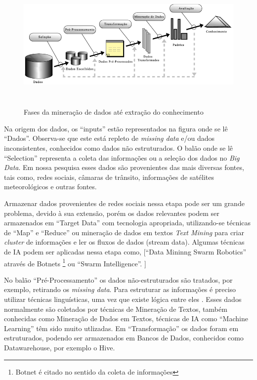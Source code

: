 \begin{figure}[!ht]
\centering
\caption{Fases da mineração de dados até extração do conhecimento}
\includegraphics[width=135mm, height=65mm]{Figuras/BigData/Fayyad.png}
\end{figure}


Na origem dos dados, os ``inputs'' estão representados na figura onde se lê ``Dados''. Observa-se que este está repleto de \textit{missing data} e/ou dados inconsistentes, conhecidos como dados não estruturados. 
O balão onde se lê ``Selection'' representa a coleta das informações ou a seleção dos dados no \textit{Big Data}.
Em nossa pesquisa esses dados são provenientes das mais diversas fontes, tais como, redes sociais, câmaras de trânsito, informações de satélites meteorológicos e outras fontes.

Armazenar dados provenientes de redes sociais nessa etapa pode ser um grande problema, devido à sua extensão, porém os dados relevantes podem ser armazenados em ``Target Data'' 
com tecnologia apropriada, utilizando-se técnicas de ``Map'' e ``Reduce'' ou mineração de dados em textos \textit{Text Mining} para criar \textit{cluster} de informações e ler os fluxos de dados (stream data). 
Algumas técnicas de IA podem ser aplicadas nessa etapa como, [``Data Mininng Swarm Robotics'' através de Botnets \footnote{Botnet é citado no sentido da coleta de informações} ou ``Swarm Intelligence''. ]

No balão ``Pré-Processamento'' os dados não-estruturados são tratados, por exemplo, retirando os \textit{missing data}. 
Para estruturar as informações é preciso utilizar técnicas linguísticas, uma vez que existe lógica entre eles \cite{Aranha2006}.
Esses dados normalmente são coletados por técnicas de Mineração de Textos, também conhecidas como Mineração de Dados em Textos, técnicas de IA como ``Machine Learning'' 
têm sido muito utlizadas. Em ``Transformação'' os dados foram em estruturados, podendo ser armazenados em Bancos de Dados, conhecidos como Datawarehouse, por exemplo o Hive. 

